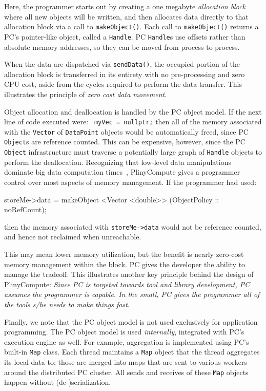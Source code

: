 \noindent
Here, the programmer starts out by creating a one megabyte \emph{allocation block} where all new objects will be written,
and then allocates data directly to that allocation block via a call to \texttt{makeObject()}.  Each call to  \texttt{makeObject()}
returns a PC's pointer-like object, called a \texttt{Handle}.  PC \texttt{Handle}s use offsets rather than absolute memory
addresses, so they can be moved from process to process.  

When the data are dispatched via \texttt{sendData()},
the occupied
portion of the allocation block is transferred in its entirety with
no pre-processing and zero CPU cost, aside from the cycles required to perform the data transfer.  
This illustrates the principle of \emph{zero cost data movement}.

Object allocation and deallocation 
is handled by the PC object model.
If the next line of code executed were:
\texttt{
myVec = nullptr;}
then all of the memory associated with the \texttt{Vector} of \texttt{DataPoint} objects would be automatically
freed, since PC \texttt{Object}s are reference counted.  This can
be expensive, however, since the PC \texttt{Object} infrastructure must traverse a potentially large graph of \texttt{Handle} objects to perform the deallocation.  
Recognizing that low-level data manipulations dominate big data
computation times~\cite{ousterhout2015making, shi2015clash}, PlinyCompute gives a programmer control
over most aspects of memory management. If the 
programmer had used: 

\begin{codesmall}
storeMe->data = makeObject <Vector <double>>
     (ObjectPolicy :: noRefCount);
\end{codesmall}


\noindent then the memory associated with \texttt{storeMe->data} would
not be reference counted, and hence not reclaimed when unreachable.  

This may mean lower memory utilization,
but the benefit is nearly zero-cost memory management within the block.
PC gives the developer the ability to manage the tradeoff.
This illustrates another key principle behind the design of
PlinyCompute: \emph{Since PC is targeted towards tool and library
  development, PC assumes the programmer is capable.  In
  the small, PC gives the programmer all of the tools s/he needs to make things fast}.

Finally, we note that the PC object model is not used exclusively 
for application programming.  The PC object model
is used \emph{internally}, integrated with PC's execution engine as well.
For example, aggregation is implemented using PC's built-in
\texttt{Map} class.  Each thread maintains
a \texttt{Map} object that the thread aggregates its local data to; those are
merged into maps that are sent to various workers around the
distributed PC
cluster.  All sends and receives of these \texttt{Map} objects happen
without (de-)serialization.

